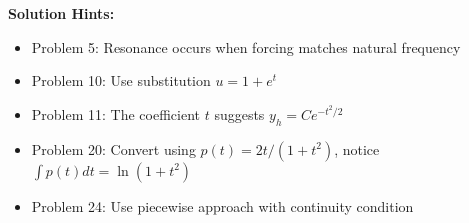 \documentclass[12pt]{article}
\begin{document}
\begin{hint}
\textbf{Solution Hints:}
\begin{itemize}
    \item Problem 5: Resonance occurs when forcing matches natural frequency
    \item Problem 10: Use substitution $u = 1 + e^t$
    \item Problem 11: The coefficient $t$ suggests $y_h = Ce^{-t^2/2}$
    \item Problem 20: Convert using $p(t) = 2t/(1+t^2)$, notice $\int p(t)dt = \ln(1+t^2)$
    \item Problem 24: Use piecewise approach with continuity condition
\end{itemize}
\end{hint}
\end{document}
